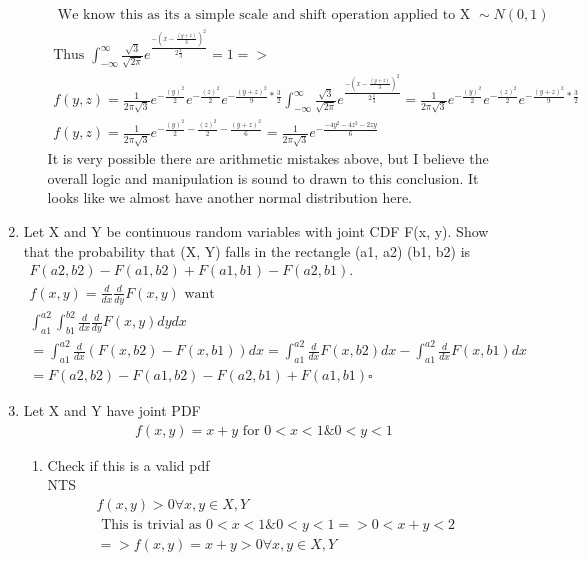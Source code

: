 \documentclass[11pt]{article}
\begin{document}
\begin{enumerate}
\begin{enumerate}
\begin{gather}
		\text{ We know this as its a simple scale and shift operation applied to X } \sim N(0,1)\\
		\text{Thus } \int_{-\infty}^{\infty} \frac{\sqrt{3}}{\sqrt{2\pi}} e ^ {\frac{-(x-\frac{(y+z)}{3})^2} {2\frac{1}{3}}} = 1 => \\
	f(y,z)	=\frac{1}{2\pi\sqrt{3}} e ^ {-\frac{(y)^2}{2}} e ^ {-\frac{(z)^2}{2}} e^{- \frac{(y+z)^2}{9} * \frac{3}{2}}   \int_{-\infty}^{\infty} \frac{\sqrt{3}}{\sqrt{2\pi}} e ^ {\frac{-(x-\frac{(y+z)}{3})^2} {2\frac{1}{3}}} = \frac{1}{2\pi\sqrt{3}} e ^ {-\frac{(y)^2}{2}} e ^ {-\frac{(z)^2}{2}} e^{- \frac{(y+z)^2}{9} * \frac{3}{2}}  \\
	f(y,z)	= \frac{1}{2\pi\sqrt{3}} e ^ {-\frac{(y)^2}{2} -\frac{(z)^2}{2} - \frac{(y+z)^2}{6}} = \frac{1}{2\pi\sqrt{3}} e ^ {-\frac{-4y^2 - 4z^2 -2zy}{6}}
	\end{gather}
	It is very possible there are arithmetic mistakes above, but I believe the overall logic and manipulation is sound to drawn to this conclusion. It looks like we almost have another normal distribution here.
\end{enumerate}
\item Let X and Y be continuous random variables with joint CDF F(x, y). Show that the probability that (X, Y) falls in the rectangle (a1, a2) (b1, b2) is
\begin{gather}
	F(a2, b2) - F(a1, b2) + F(a1, b1) - F(a2, b1).\\
	f(x,y) = \frac{d}{dx}\frac{d}{dy}F(x,y) \text{ want} \\
	\int_{a1}^{a2}\int_{b1}^{b2}\frac{d}{dx}\frac{d}{dy}F(x,y)dydx\\
	=\int_{a1}^{a2}\frac{d}{dx}(F(x,b2)-F(x,b1)) dx = \int_{a1}^{a2}\frac{d}{dx}F(x,b2) dx - \int_{a1}^{a2}\frac{d}{dx}F(x,b1) dx\\
	= F(a2,b2)-F(a1,b2)-F(a2,b1)+F(a1,b1) \square
\end{gather}
\item Let X and Y have joint PDF
\begin{gather}
	f(x,y) = x+y \text{ for } 0<x<1 \& 0<y<1
\end{gather}
\begin{enumerate}
	\item Check if this is a valid pdf\\
	NTS
	\begin{gather}
		f(x,y)>0 \forall x,y \in X,Y \\
		\text{ This is trivial as } 0<x<1 \& 0<y<1 =>  0<x+y<2 \\
		=> f(x,y) = x+y >0 \forall x,y \in X,Y \\

\end{gather}
\end{enumerate}
\end{enumerate}
\end{document}
